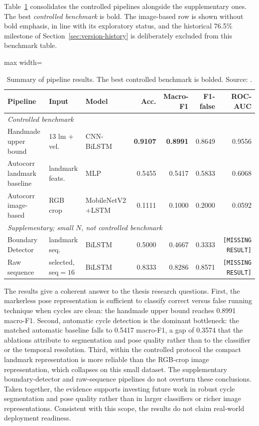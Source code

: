 Table~\ref{tab:summary} consolidates the controlled pipelines alongside the
supplementary ones. The best \emph{controlled benchmark} is bold. The
image-based row is shown without bold emphasis, in line with its exploratory
status, and the historical 76.5\% milestone of
Section~\ref{sec:version-history} is deliberately excluded from this benchmark
table.

\begin{table}[htbp]
\centering
\caption[Summary of pipeline results.]{Summary of pipeline results. The best controlled benchmark is bolded. Source: \protect{}.}
\label{tab:summary}
\tablefont
\begin{adjustbox}{max width=\textwidth}
\begin{tabular}{lllrrrr}
\toprule
Pipeline & Input & Model & Acc. & Macro-F1 & F1-false & ROC-AUC \\
\midrule
\multicolumn{7}{l}{\emph{Controlled benchmark}} \\
Handmade upper bound & 13 lm $+$ vel. & CNN-BiLSTM & \textbf{0.9107} & \textbf{0.8991} & 0.8649 & 0.9556 \\
Autocorr landmark baseline & landmark feats. & MLP & 0.5455 & 0.5417 & 0.5833 & 0.6068 \\
Autocorr image-based & RGB crop & MobileNetV2$+$LSTM & 0.1111 & 0.1000 & 0.2000 & 0.0592 \\
\midrule
\multicolumn{7}{l}{\emph{Supplementary; small $N$, not controlled benchmark}} \\
Boundary Detector & landmark seq. & BiLSTM & 0.5000 & 0.4667 & 0.3333 & \texttt{[MISSING RESULT]} \\
Raw sequence & selected, seq$=16$ & BiLSTM & 0.8333 & 0.8286 & 0.8571 & \texttt{[MISSING RESULT]} \\
\bottomrule
\end{tabular}
\end{adjustbox}
\end{table}

The results give a coherent answer to the thesis research questions. First,
the markerless pose representation is sufficient to classify correct versus
false running technique when cycles are clean: the handmade upper bound reaches
0.8991 macro-F1. Second, automatic cycle detection is the dominant bottleneck:
the matched automatic baseline falls to 0.5417 macro-F1, a gap of 0.3574 that
the ablations attribute to segmentation and pose quality rather than to the
classifier or the temporal resolution. Third, within the controlled protocol
the compact landmark representation is more reliable than the RGB-crop image
representation, which collapses on this small dataset. The supplementary
boundary-detector and raw-sequence pipelines do not overturn these conclusions.
Taken together, the evidence supports investing future work in robust cycle
segmentation and pose quality rather than in larger classifiers or richer image
representations. Consistent with this scope, the results do
not claim real-world deployment readiness.